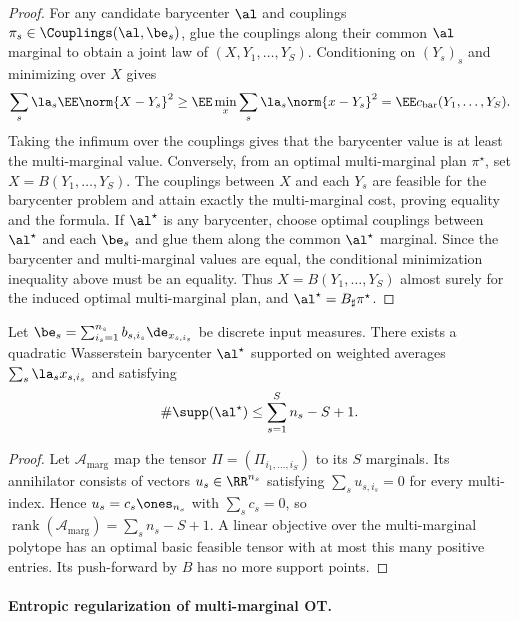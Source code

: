 \begin{proof}
	For any candidate barycenter $\al$ and couplings $\pi_s\in\Couplings(\al,\be_s)$, glue the couplings along their common $\al$ marginal to obtain a joint law of $(X,Y_1,\ldots,Y_S)$. Conditioning on $(Y_s)_s$ and minimizing over $X$ gives
	\[
		\sum_s\la_s\EE\norm{X-Y_s}^2
		\geq
		\EE\min_x\sum_s\la_s\norm{x-Y_s}^2
		=
		\EE c_{\mathrm{bar}}(Y_1,\ldots,Y_S).
	\]
	Taking the infimum over the couplings gives that the barycenter value is at least the multi-marginal value. Conversely, from an optimal multi-marginal plan $\pi^\star$, set $X=B(Y_1,\ldots,Y_S)$. The couplings between $X$ and each $Y_s$ are feasible for the barycenter problem and attain exactly the multi-marginal cost, proving equality and the formula.
	If $\al^\star$ is any barycenter, choose optimal couplings between $\al^\star$ and each $\be_s$ and glue them along the common $\al^\star$ marginal. Since the barycenter and multi-marginal values are equal, the conditional minimization inequality above must be an equality. Thus $X=B(Y_1,\ldots,Y_S)$ almost surely for the induced optimal multi-marginal plan, and $\al^\star=B_\sharp\pi^\star$.
\end{proof}

\begin{cor}\label{cor-discrete-barycenters}
	Let $\be_s=\sum_{i_s=1}^{n_s}b_{s,i_s}\de_{x_{s,i_s}}$ be discrete input measures. There exists a quadratic Wasserstein barycenter $\al^\star$ supported on weighted averages $\sum_s\la_s x_{s,i_s}$ and satisfying
	\[
		\#\supp(\al^\star)\leq\sum_{s=1}^S n_s-S+1.
	\]
\end{cor}

\begin{proof}
	Let $\mathcal A_{\mathrm{marg}}$ map the tensor $\Pi=(\Pi_{i_1,\ldots,i_S})$ to its $S$ marginals. Its annihilator consists of vectors $u_s\in\RR^{n_s}$ satisfying $\sum_su_{s,i_s}=0$ for every multi-index. Hence $u_s=c_s\ones_{n_s}$ with $\sum_sc_s=0$, so $\operatorname{rank}(\mathcal A_{\mathrm{marg}})=\sum_s n_s-S+1$. A linear objective over the multi-marginal polytope has an optimal basic feasible tensor with at most this many positive entries. Its push-forward by $B$ has no more support points.
\end{proof}

\paragraph{Entropic regularization of multi-marginal OT.}

